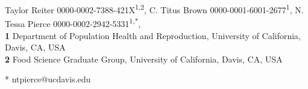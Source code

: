 \documentclass[10pt,letterpaper]{article}
\begin{document}
\vspace*{0.2in}

\begin{flushleft}
{\Large
\textbf{} %
}
\newline


Taylor Reiter 0000-0002-7388-421X\textsuperscript{1,2},
C. Titus Brown 0000-0001-6001-2677\textsuperscript{1},
N. Tessa Pierce 0000-0002-2942-5331\textsuperscript{1,*},
\\
\bigskip
\textbf{1} Department of Population Health and Reproduction, University of California, Davis, CA, USA
\\
\textbf{2} Food Science Graduate Group, University of California, Davis, CA, USA
\\
\bigskip

% 
%





* ntpierce@ucdavis.edu

\end{flushleft}
\end{document}
